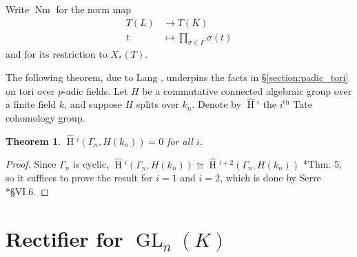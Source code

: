 \documentclass{amsart}
\theoremstyle{plain}
\newtheorem{theorem}{Theorem}[section]
\newcommand{\HT}[1]{\hat{\HH}{}^{#1}}
\theoremstyle{definition}
\numberwithin{equation}{section}
\DeclareMathOperator{\HH}{H}
\DeclareMathOperator{\Nm}{Nm}
\DeclareMathOperator{\GL}{GL}
\begin{document}
Write $\Nm$ for the norm map
\begin{align*}
T(L) &\rightarrow T(K) \\
t &\mapsto \prod_{\sigma \in \Gamma} \sigma(t)
\end{align*}
and for its restriction to $X_*(T)$.

The following theorem, due to Lang \cite{lang:56a}, underpins the facts in
\S\ref{section:padic_tori} on tori over $p$-adic fields.
Let $H$ be a commutative connected algebraic group over a
finite field $k$, and suppose $H$ splits over $k_n$.  Denote by $\HT{i}$ the $i^{\mathrm{th}}$
Tate cohomology group.

\begin{theorem} \label{thm:lang}
$\HT{i}(\Gamma_n, H(k_n)) = 0$ for all $i$.
\end{theorem}
\begin{proof}
Since $\Gamma_n$ is cyclic,
$\HT{i}(\Gamma_n, H(k_n)) \cong \HT{i+2}(\Gamma_n, H(k_n))$ \cite{atiyah-wall:CohomologyGrps}*{Thm. 5},
so it suffices to prove the result for $i=1$ and $i=2$, which is done
by Serre \cite{serre:AlgGrpsClassFields}*{\S VI.6}.
\end{proof}

\section{Rectifier for $\GL_{n}(K)$} \label{section:BH_recall}
\end{document}
